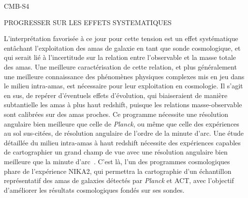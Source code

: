 CMB-S4

PROGRESSER SUR LES EFFETS SYSTEMATIQUES

L’interprétation favorisée à ce jour pour cette tension est un effet
systématique entâchant l’exploitation des amas de galaxie en tant que
sonde cosmologique, et qui serait lié à l’incertitude sur la relation
entre l’observable et la masse totale des amas. Une meilleure
caractérisation de cette relation, et plus généralement une meilleure
connaissance des phénomènes physiques complexes mis en jeu dans le
milieu intra-amas, est nécessaire pour leur exploitation en cosmologie. 
Il s’agit en sus, de repérer d’éventuels effets d’évolution, qui
biaiseraient de manière subtantielle les amas à plus haut redshift,
puisque les relations masse-observable sont calibrées sur des amas
proches. Ce programme nécessite une résolution angulaire bien
meilleure que celle de \emph{Planck}, ou même que celle des
expériences au sol sus-citées, de résolution angulaire de l'ordre de
la minute d'arc. Une étude détaillée du milieu intra-amas à haut
redshift nécessite des expériences capables de cartographier un grand
champ de vue avec une résolution angulaire bien meilleure que la
minute d'arc~. C’est là, l’un des programmes
cosmologiques phare de l’expérience NIKA2, qui permettra la
cartographie d’un échantillon représentatif des amas de galaxies
détectés par \emph{Planck} et ACT, avec l’objectif d’améliorer les
résultats cosmologiques fondés sur ses sondes.\\



